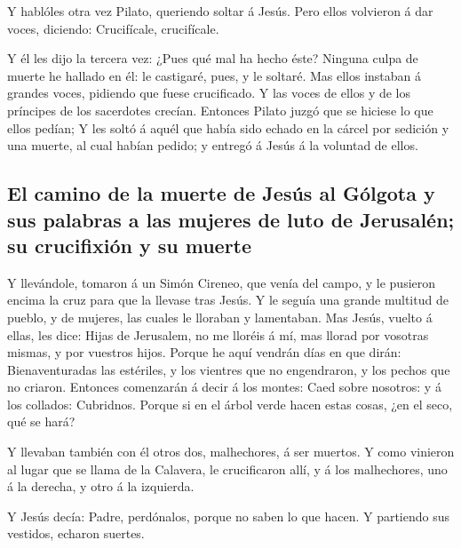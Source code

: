  Y hablóles otra vez Pilato, queriendo soltar á Jesús.
 Pero ellos volvieron á dar voces, diciendo: Crucifícale,
crucifícale.

 Y él les dijo la tercera vez: ¿Pues qué mal ha hecho
éste? Ninguna culpa de muerte he hallado en él: le castigaré, pues, y le
soltaré.  Mas ellos instaban á grandes voces, pidiendo
que fuese crucificado. Y las voces de ellos y de los príncipes de los
sacerdotes crecían.  Entonces Pilato juzgó que se hiciese
lo que ellos pedían;  Y les soltó á aquél que había sido
echado en la cárcel por sedición y una muerte, al cual habían pedido; y
entregó á Jesús á la voluntad de ellos.

\hypertarget{el-camino-de-la-muerte-de-jesuxfas-al-guxf3lgota-y-sus-palabras-a-las-mujeres-de-luto-de-jerusaluxe9n-su-crucifixiuxf3n-y-su-muerte}{%
\subsection{El camino de la muerte de Jesús al Gólgota y sus palabras a
las mujeres de luto de Jerusalén; su crucifixión y su
muerte}\label{el-camino-de-la-muerte-de-jesuxfas-al-guxf3lgota-y-sus-palabras-a-las-mujeres-de-luto-de-jerusaluxe9n-su-crucifixiuxf3n-y-su-muerte}}

 Y llevándole, tomaron á un Simón Cireneo, que venía del
campo, y le pusieron encima la cruz para que la llevase tras Jesús.
 Y le seguía una grande multitud de pueblo, y de mujeres,
las cuales le lloraban y lamentaban.  Mas Jesús, vuelto á
ellas, les dice: Hijas de Jerusalem, no me lloréis á mí, mas llorad por
vosotras mismas, y por vuestros hijos.  Porque he aquí
vendrán días en que dirán: Bienaventuradas las estériles, y los vientres
que no engendraron, y los pechos que no criaron. 
Entonces comenzarán á decir á los montes: Caed sobre nosotros: y á los
collados: Cubridnos.  Porque si en el árbol verde hacen
estas cosas, ¿en el seco, qué se hará?

 Y llevaban también con él otros dos, malhechores, á ser
muertos.  Y como vinieron al lugar que se llama de la
Calavera, le crucificaron allí, y á los malhechores, uno á la derecha, y
otro á la izquierda.

 Y Jesús decía: Padre, perdónalos, porque no saben lo que
hacen. Y partiendo sus vestidos, echaron suertes.

